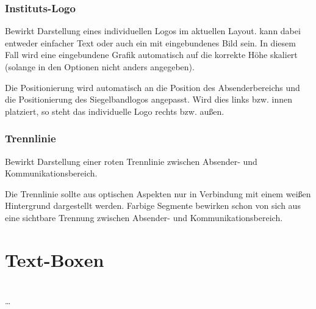 \subsubsection{Instituts-Logo}

\vspace*{-5mm}
\begin{Declaration}
\end{Declaration}

Bewirkt Darstellung eines individuellen Logos im aktuellen Layout.
 kann dabei entweder einfacher Text oder auch ein
mit  eingebundenes Bild sein.
In diesem Fall wird eine eingebundene Grafik automatisch auf die korrekte
Höhe skaliert (solange in den Optionen nicht anders angegeben).

Die Positionierung wird automatisch an die Position des Absenderbereichs und
die Positionierung des Siegelbandlogos angepasst.
Wird dies links bzw. innen platziert, so steht das individuelle
Logo rechts bzw. außen.

\subsubsection{Trennlinie}

\vspace*{-5mm}
\begin{Declaration}
\end{Declaration}

Bewirkt Darstellung einer roten Trennlinie zwischen Absender- und Kommunikationsbereich.

\begin{hint}
  Die Trennlinie sollte aus optischen Aspekten nur in Verbindung
  mit einem weißen Hintergrund dargestellt werden.
  Farbige Segmente bewirken schon von sich aus eine sichtbare Trennung zwischen 
  Absender- und Kommunikationsbereich.
\end{hint}


\clearpage
\section{Text-Boxen}\label{sec:gausslayout:gaussbox}

\begin{Declaration}
          \\
  \quad\dots\\
\end{Declaration}

